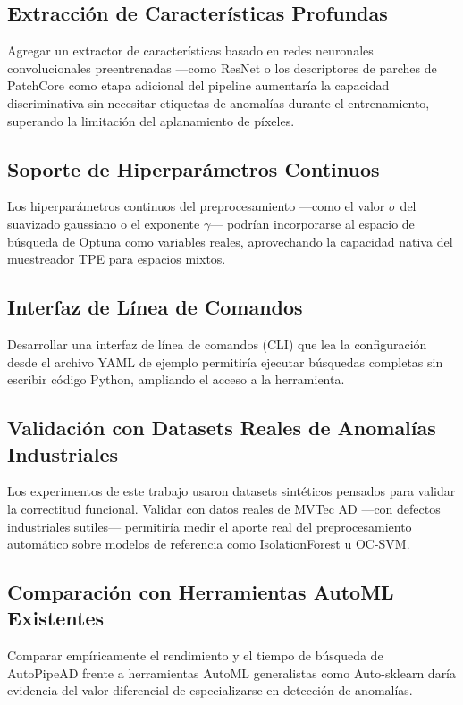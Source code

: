 \documentclass[conference,spanish]{IEEEtran}
\begin{document}
\subsection{Extracción de Características Profundas}

Agregar un extractor de características basado en redes neuronales
convolucionales preentrenadas —como ResNet o los
descriptores de parches de PatchCore como etapa
adicional del pipeline aumentaría la capacidad discriminativa sin
necesitar etiquetas de anomalías durante el entrenamiento, superando la
limitación del aplanamiento de píxeles.

\subsection{Soporte de Hiperparámetros Continuos}

Los hiperparámetros continuos del preprocesamiento —como el valor
$\sigma$ del suavizado gaussiano o el exponente $\gamma$— podrían
incorporarse al espacio de búsqueda de Optuna como variables reales, aprovechando la capacidad nativa del
muestreador TPE para espacios mixtos.

\subsection{Interfaz de Línea de Comandos}

Desarrollar una interfaz de línea de comandos (CLI) que lea la
configuración desde el archivo YAML de ejemplo permitiría ejecutar búsquedas completas sin escribir código Python,
ampliando el acceso a la herramienta.

\subsection{Validación con Datasets Reales de Anomalías Industriales}

Los experimentos de este trabajo usaron datasets sintéticos pensados para
validar la correctitud funcional. Validar con datos reales de MVTec
AD —con defectos industriales sutiles— permitiría
medir el aporte real del preprocesamiento automático sobre modelos de
referencia como IsolationForest u OC-SVM.

\subsection{Comparación con Herramientas AutoML Existentes}

Comparar empíricamente el rendimiento y el tiempo de búsqueda de
AutoPipeAD frente a herramientas AutoML generalistas como
Auto-sklearn daría evidencia del valor diferencial
de especializarse en detección de anomalías.
\end{document}
